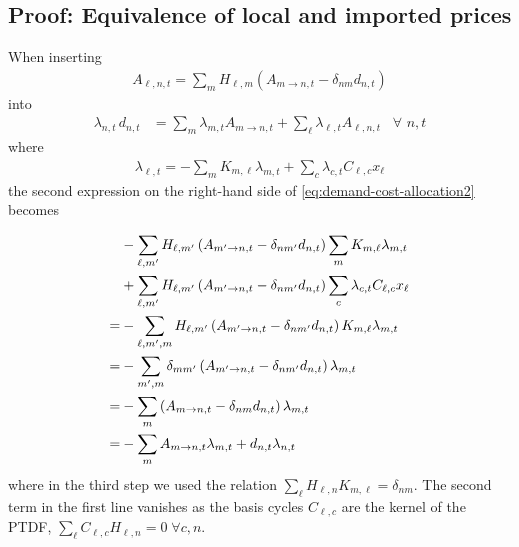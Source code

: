 \documentclass[11pt,twocolumn]{article}
\newcommand{\Forall}[1]{\hspace{10pt} \forall \,\, #1 }
\newcommand{\lmp}[1][n]{\lambda_{#1,t}}
\newcommand{\demand}[1][n]{d_{#1,t}}
\newcommand{\incidence}[1][n]{K_{#1,\ell}}
\newcommand{\ptdf}[1][n]{H_{\ell,#1}}
\newcommand{\cycle}{C_{\ell,c}}
\newcommand{\reactance}{x_\ell}
\newcommand{\cycleprice}{\lambda_{c,t}}
\newcommand{\allocatepeer}[1][m \rightarrow n]{A_{#1,t}}
\newcommand{\allocateflow}[1][n]{A_{\ell,#1,t}}
\begin{document}
\subsection{Proof: Equivalence of local and imported prices}
\label{sec:proof_equivalence}

When inserting 
\begin{align}
    \allocateflow = \sum_m \ptdf[m] (\allocatepeer - \delta_{nm} \demand) 
    \label{eq:allocateflow2}
\end{align}
into 
\begin{align}
    \lmp\, \demand &= \sum_m \lmp[m] \allocatepeer + \sum_\ell \lmp[\ell] \allocateflow \Forall{n,t}
    \label{eq:demand-cost-allocation2}
\end{align}
where 
\begin{align}
    \lmp[\ell] = - \sum_m \incidence[m] \lmp[m]  + \sum_c  \cycleprice \cycle \reactance   
\end{align}
the second expression on the right-hand side of \cref{eq:demand-cost-allocation2} becomes 



\begin{align}
    \notag
    &- \sum_{\ell, m'} \ptdf[m'] \left( \allocatepeer[m' \rightarrow n]  - \delta_{n m'} \demand \right) \sum_m \incidence[m] \lmp[m] \\
    \notag
    &+ \sum_{\ell, m'} \ptdf[m'] \left( \allocatepeer[m' \rightarrow n]  - \delta_{n m'} \demand \right) \sum_c  \cycleprice \cycle \reactance   \\
    \notag
    =& - \sum_{\ell, m', m} \ptdf[m'] \left( \allocatepeer[m' \rightarrow n]  - \delta_{n m'} \demand \right) \incidence[m] \lmp[m] \\
    \notag
    =& - \sum_{m', m} \delta_{m m'} \left( \allocatepeer[m' \rightarrow n]  - \delta_{n m'} \demand \right) \lmp[m] \\
    \notag
    =& - \sum_{m} \left( \allocatepeer - \delta_{n m} \demand \right) \lmp[m] \\
    =& - \sum_{m} \allocatepeer \lmp[m] + \demand \lmp 
\end{align}
where in the third step we used the relation $\sum_\ell \ptdf \incidence[m] = \delta_{n m}$.
The second term in the first line vanishes as the basis cycles $\cycle$ are the kernel of the PTDF, $\sum_{\ell} \cycle \ptdf  = 0 \; \forall c,n$. 
\end{document}
